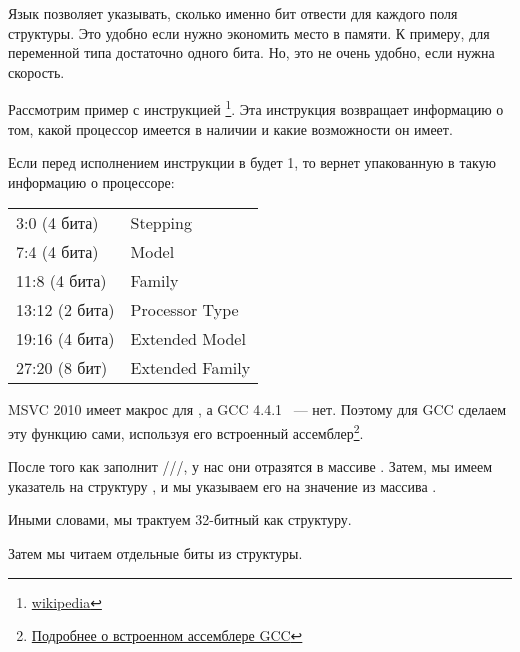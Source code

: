 
Язык \CCpp позволяет указывать, сколько именно бит отвести для каждого поля структуры. 
Это удобно если нужно экономить место в памяти. К примеру, для переменной типа \Tbool достаточно одного бита.
Но, это не очень удобно, если нужна скорость.


\newcommand{\FNCPUID}{\footnote{\href{http://go.yurichev.com/17069}{wikipedia}}}

\label{cpuid}
Рассмотрим пример с инструкцией \CPUID\FNCPUID. 
Эта инструкция возвращает информацию о том, какой процессор имеется в наличии и какие возможности он имеет.

Если перед исполнением инструкции в \EAX будет 1, 
то \CPUID вернет упакованную в \EAX такую информацию о процессоре:

\begin{center}
\begin{tabular}{ | l | l | }
\hline
3:0 (4 бита)& Stepping \\
7:4 (4 бита) & Model \\
11:8 (4 бита) & Family \\
13:12 (2 бита) & Processor Type \\
19:16 (4 бита) & Extended Model \\
27:20 (8 бит) & Extended Family \\
\hline
\end{tabular}
\end{center}

\newcommand{\FNGCCAS}{\footnote{\href{http://go.yurichev.com/17070}
{Подробнее о встроенном ассемблере GCC}}}

MSVC 2010 имеет макрос для \CPUID, а GCC 4.4.1 ~--- нет. 
Поэтому для GCC сделаем эту функцию сами, используя его встроенный ассемблер\FNGCCAS.



После того как \CPUID заполнит \EAX/\EBX/\ECX/\EDX, у нас они отразятся в массиве . 
Затем, мы имеем указатель на структуру , и мы указываем его на значение 
\EAX из массива .

Иными словами, мы трактуем 32-битный \Tint как структуру.

Затем мы читаем отдельные биты из структуры.

